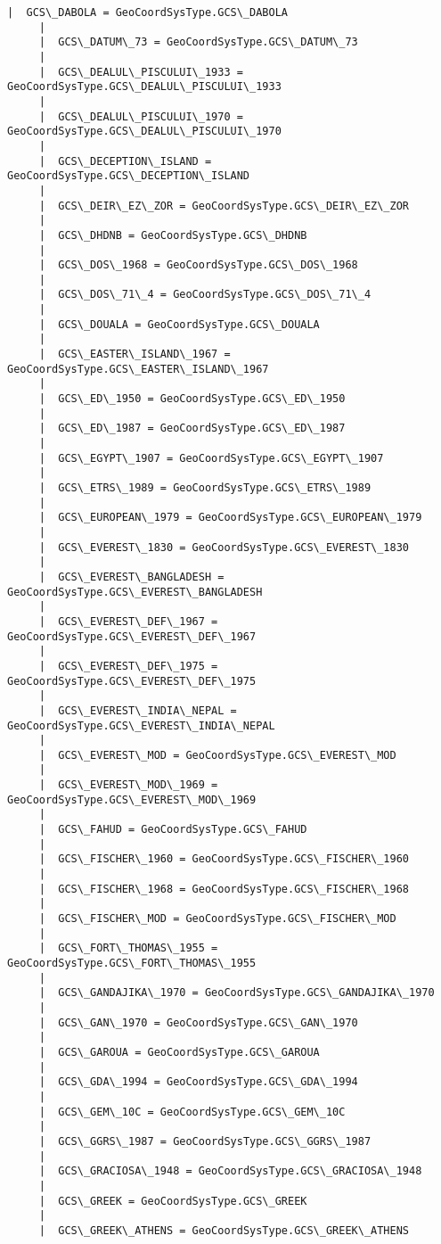\documentclass[11pt]{article}
\begin{document}
\begin{Verbatim}[commandchars=\\\{\}]
     |  GCS\_DABOLA = GeoCoordSysType.GCS\_DABOLA
     |  
     |  GCS\_DATUM\_73 = GeoCoordSysType.GCS\_DATUM\_73
     |  
     |  GCS\_DEALUL\_PISCULUI\_1933 = GeoCoordSysType.GCS\_DEALUL\_PISCULUI\_1933
     |  
     |  GCS\_DEALUL\_PISCULUI\_1970 = GeoCoordSysType.GCS\_DEALUL\_PISCULUI\_1970
     |  
     |  GCS\_DECEPTION\_ISLAND = GeoCoordSysType.GCS\_DECEPTION\_ISLAND
     |  
     |  GCS\_DEIR\_EZ\_ZOR = GeoCoordSysType.GCS\_DEIR\_EZ\_ZOR
     |  
     |  GCS\_DHDNB = GeoCoordSysType.GCS\_DHDNB
     |  
     |  GCS\_DOS\_1968 = GeoCoordSysType.GCS\_DOS\_1968
     |  
     |  GCS\_DOS\_71\_4 = GeoCoordSysType.GCS\_DOS\_71\_4
     |  
     |  GCS\_DOUALA = GeoCoordSysType.GCS\_DOUALA
     |  
     |  GCS\_EASTER\_ISLAND\_1967 = GeoCoordSysType.GCS\_EASTER\_ISLAND\_1967
     |  
     |  GCS\_ED\_1950 = GeoCoordSysType.GCS\_ED\_1950
     |  
     |  GCS\_ED\_1987 = GeoCoordSysType.GCS\_ED\_1987
     |  
     |  GCS\_EGYPT\_1907 = GeoCoordSysType.GCS\_EGYPT\_1907
     |  
     |  GCS\_ETRS\_1989 = GeoCoordSysType.GCS\_ETRS\_1989
     |  
     |  GCS\_EUROPEAN\_1979 = GeoCoordSysType.GCS\_EUROPEAN\_1979
     |  
     |  GCS\_EVEREST\_1830 = GeoCoordSysType.GCS\_EVEREST\_1830
     |  
     |  GCS\_EVEREST\_BANGLADESH = GeoCoordSysType.GCS\_EVEREST\_BANGLADESH
     |  
     |  GCS\_EVEREST\_DEF\_1967 = GeoCoordSysType.GCS\_EVEREST\_DEF\_1967
     |  
     |  GCS\_EVEREST\_DEF\_1975 = GeoCoordSysType.GCS\_EVEREST\_DEF\_1975
     |  
     |  GCS\_EVEREST\_INDIA\_NEPAL = GeoCoordSysType.GCS\_EVEREST\_INDIA\_NEPAL
     |  
     |  GCS\_EVEREST\_MOD = GeoCoordSysType.GCS\_EVEREST\_MOD
     |  
     |  GCS\_EVEREST\_MOD\_1969 = GeoCoordSysType.GCS\_EVEREST\_MOD\_1969
     |  
     |  GCS\_FAHUD = GeoCoordSysType.GCS\_FAHUD
     |  
     |  GCS\_FISCHER\_1960 = GeoCoordSysType.GCS\_FISCHER\_1960
     |  
     |  GCS\_FISCHER\_1968 = GeoCoordSysType.GCS\_FISCHER\_1968
     |  
     |  GCS\_FISCHER\_MOD = GeoCoordSysType.GCS\_FISCHER\_MOD
     |  
     |  GCS\_FORT\_THOMAS\_1955 = GeoCoordSysType.GCS\_FORT\_THOMAS\_1955
     |  
     |  GCS\_GANDAJIKA\_1970 = GeoCoordSysType.GCS\_GANDAJIKA\_1970
     |  
     |  GCS\_GAN\_1970 = GeoCoordSysType.GCS\_GAN\_1970
     |  
     |  GCS\_GAROUA = GeoCoordSysType.GCS\_GAROUA
     |  
     |  GCS\_GDA\_1994 = GeoCoordSysType.GCS\_GDA\_1994
     |  
     |  GCS\_GEM\_10C = GeoCoordSysType.GCS\_GEM\_10C
     |  
     |  GCS\_GGRS\_1987 = GeoCoordSysType.GCS\_GGRS\_1987
     |  
     |  GCS\_GRACIOSA\_1948 = GeoCoordSysType.GCS\_GRACIOSA\_1948
     |  
     |  GCS\_GREEK = GeoCoordSysType.GCS\_GREEK
     |  
     |  GCS\_GREEK\_ATHENS = GeoCoordSysType.GCS\_GREEK\_ATHENS

\end{Verbatim}
\end{document}
